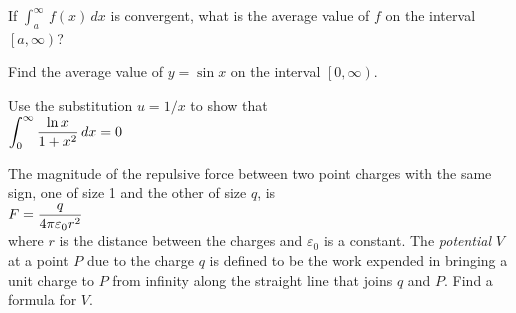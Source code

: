 \documentclass{sebase}
\begin{document}
\begin{multicols}{2}
\begin{ExerciseList}
\begin{ExerciseList}
%

\item[(c)] If $\int_{a}^{\infty }\,f(x)\,dx$ is convergent, what is the
average value of $f$ on the interval $\left[ a,\infty \right) $?

%

\item[(d)] Find the average value of $y=\sin x$ on the interval $\left[
0,\infty \right) $.

%
\end{ExerciseList}

\item[\hfill 79.] Use the substitution $u=1/x$ to show that\\[4pt]
$\hspace*{\fill}\dint\nolimits_{0}^{\infty }\dfrac{\ln x}{1+x^{2}}\,dx=0%
\hspace*{\fill}$

%

%

\item[\hfill 80.] The magnitude of the repulsive force between two point
charges with the same sign, one of size 1 and the other of size $q$, is\\[4pt%
]
$\hspace*{\fill}F=\dfrac{q}{4\pi \varepsilon _{0}r^{2}}\hspace*{\fill}$\\[4pt%
]
where $r$ is the distance between the charges and $\varepsilon _{0}$ is a
constant. The \textit{potential }$V$ at a point $P$ due to the charge $q$ is
defined to be the work expended in bringing a unit charge to $P$ from
infinity along the straight line that joins $q$ and $P$. Find a formula for $%
V$.


\end{ExerciseList}
\end{multicols}
\end{document}
